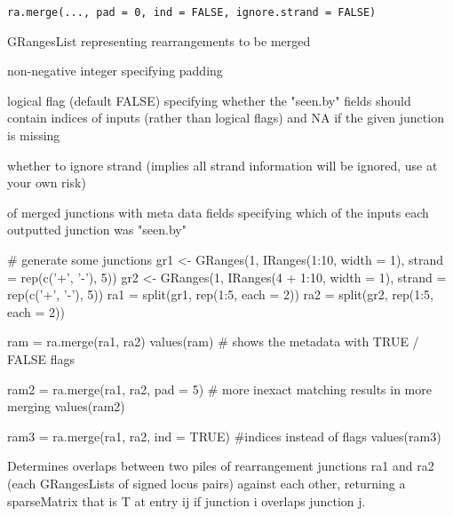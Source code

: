 \documentclass[a4paper]{book}
\begin{document}
%
\begin{Usage}
\begin{verbatim}
ra.merge(..., pad = 0, ind = FALSE, ignore.strand = FALSE)
\end{verbatim}
\end{Usage}
%
\begin{Arguments}
\begin{ldescription}
\item[\code{...}] GRangesList representing rearrangements to be merged

\item[\code{pad}] non-negative integer specifying padding

\item[\code{ind}] logical flag (default FALSE) specifying whether the "seen.by" fields should contain indices of inputs (rather than logical flags) and NA if the given junction is missing

\item[\code{ignore.strand}] whether to ignore strand (implies all strand information will be ignored, use at your own risk)
\end{ldescription}
\end{Arguments}
%
\begin{Value}
 of merged junctions with meta data fields specifying which of the inputs each outputted junction was "seen.by"
\end{Value}
%
\begin{Examples}
\begin{ExampleCode}

# generate some junctions
gr1 <- GRanges(1, IRanges(1:10, width = 1), strand = rep(c('+', '-'), 5))
gr2 <- GRanges(1, IRanges(4 + 1:10, width = 1), strand = rep(c('+', '-'), 5))
ra1 = split(gr1, rep(1:5, each = 2))
ra2 = split(gr2, rep(1:5, each = 2))

ram = ra.merge(ra1, ra2)
values(ram) # shows the metadata with TRUE / FALSE flags

ram2 = ra.merge(ra1, ra2, pad = 5) # more inexact matching results in more merging
values(ram2)

ram3 = ra.merge(ra1, ra2, ind = TRUE) #indices instead of flags
values(ram3)
\end{ExampleCode}
\end{Examples}
%
\begin{Description}\relax
Determines overlaps between two piles of rearrangement junctions ra1 and ra2 (each GRangesLists of signed locus pairs)
against each other, returning a sparseMatrix that is T at entry ij if junction i overlaps junction j.
\end{Description}
\end{document}
